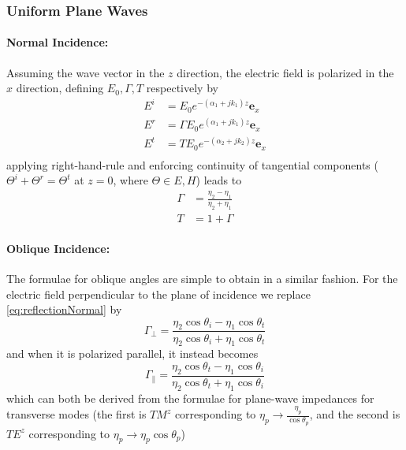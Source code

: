 \documentclass{article}
\numberwithin{equation}{section}
\begin{document}
        \subsubsection*{Uniform Plane Waves}
        \paragraph*{Normal Incidence:}
        Assuming the wave vector in the $z$ direction, the electric field is polarized
        in the $x$ direction, defining $E_0, \Gamma, T$ respectively by
        \begin{subequations} 
            \begin{align*}
                E^i &= E_0 e^{-(\alpha_1 + jk_1) z} \mathbf{e}_x \\
                E^r &= \Gamma E_0 e^{(\alpha_1 + jk_1)z} \mathbf{e}_x \\
                E^t &= T E_0 e^{-(\alpha_2 + jk_2) z} \mathbf{e}_x \\
            \end{align*}
        \end{subequations}
        applying right-hand-rule and enforcing continuity of tangential components
        ($\Theta^i + \Theta^r = \Theta^t$ at $z=0$, where $\Theta \in {E,H}$) leads to 
        \begin{subequations} \label{eq:losslessNormalReflection}
            \begin{align}
                \Gamma &= \frac{\eta_2 - \eta_1}{\eta_2 + \eta_1}
                    \label{eq:reflectionNormal} \\
                T &= 1 + \Gamma
            \end{align}
        \end{subequations}

        \paragraph*{Oblique Incidence:}
        The formulae for oblique angles are simple to obtain in a similar fashion. For
        the electric field perpendicular to the plane of incidence we replace
        \eqref{eq:reflectionNormal} by
        \begin{equation} \label{eq:reflectionObliquePerp}
            \Gamma_{\perp} = \frac{\eta_2 \cos \theta_i - \eta_1 \cos \theta_t }{\eta_2
            \cos \theta_i + \eta_1 \cos \theta_t}
        \end{equation}
        and when it is polarized parallel, it instead becomes
        \begin{equation} \label{eq:reflectionObliquePar}
            \Gamma_{\parallel} = \frac{\eta_2 \cos \theta_t - \eta_1 \cos \theta_i
            }{\eta_2 \cos \theta_t + \eta_1 \cos \theta_i}
        \end{equation}
        which can both be derived from the formulae for plane-wave impedances for
        transverse modes (the first is $TM^z$ corresponding to $\eta_p \to
        \frac{\eta_p}{\cos \theta_p}$, and the second is $TE^z$ corresponding to $\eta_p
        \to \eta_p \cos \theta_p $)
        \newpage
\end{document}
